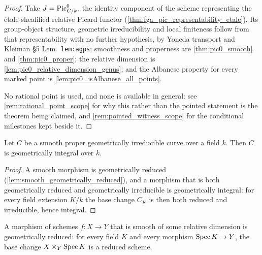 \begin{proof}
  Take \(J = \operatorname{Pic}^0_{C/k}\), the identity component of the scheme representing the
  \'etale-sheafified relative Picard functor
  (\cref{thm:fga_pic_representability_etale}). Its group-object structure, geometric
  irreducibility and local finiteness follow from that representability with no
  further hypothesis, by Yoneda transport and Kleiman \S 5 Lem.~\texttt{lem:agps};
  smoothness and properness are \cref{thm:pic0_smooth} and \cref{thm:pic0_proper};
  the relative dimension is \cref{lem:pic0_relative_dimension_genus}; and the
  Albanese property for every marked point is
  \cref{lem:pic0_isAlbanese_all_points}.

  No rational point is used, and none is available in general: see
  \cref{rem:rational_point_scope} for why this rather than the pointed statement is
  the theorem being claimed, and \cref{rem:pointed_witness_scope} for the conditional
  milestones kept beside it.
\end{proof}

\begin{lemma}
  \label{lem:curve_geometrically_integral}
  \leanok
  Let \(C\) be a smooth proper geometrically irreducible curve over a field \(k\).
  Then \(C\) is geometrically integral over \(k\).
\end{lemma}

\begin{proof}
  \leanok
  A smooth morphism is geometrically reduced
  (\cref{lem:smooth_geometrically_reduced}), and a morphism that is both
  geometrically reduced and geometrically irreducible is geometrically integral:
  for every field extension \(K/k\) the base change \(C_K\) is then both reduced
  and irreducible, hence integral.
\end{proof}

\begin{lemma}
  \label{lem:smooth_geometrically_reduced}
  \leanok
  A morphism of schemes \(f\colon X\to Y\) that is smooth of some relative
  dimension is geometrically reduced: for every field \(K\) and every morphism
  \(\operatorname{Spec} K\to Y\), the base change \(X\times_Y\operatorname{Spec} K\) is a reduced scheme.
\end{lemma}


